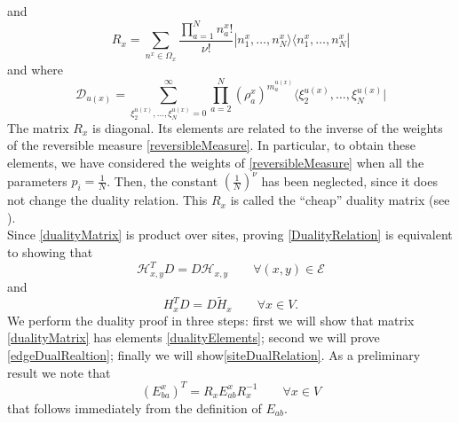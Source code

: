 \documentclass[11pt]{article}
\numberwithin{equation}{section}
\numberwithin{equation}{subsection}
\newcommand{\dd}{\mathcal{D}_{u(x)}}
\begin{document}
and
\begin{equation}\label{Revmatrix}
    R_{x}=\sum_{n^{x}\in\Omega_{x}}\frac{\prod_{a=1}^{N}n_{a}^{x}!}{\nu!}|n_{1}^{x},\ldots,n_{N}^{x}\rangle\langle n_{1}^{x},\ldots,n_{N}^{x}|
\end{equation}
and where 
\begin{equation}\label{dualityMatrix2}
\dd=\sum_{\xi_{2}^{u(x)},\ldots,\xi_{N}^{u(x)}=0}^{\infty}\prod_{a=2}^{N}\left(\rho_{a}^{x}\right)^{m_{a}^{u(x)}}\langle \xi_{2}^{u(x)},\ldots,\xi_{N}^{u(x)}|
\end{equation}
The matrix $R_{x}$ is diagonal. Its elements are related to the inverse of the weights of the reversible measure \eqref{reversibleMeasure}. In particular, to obtain these elements, we have considered the weights of \eqref{reversibleMeasure} when all the parameters $p_{i}=\frac{1}{N}$. Then, the constant $\left(\frac{1}{N}\right)^{\nu}$ has been neglected, since it does not change the duality relation. This $R_{x}$ is called the ``cheap'' duality matrix (see \cite{giardina2009duality}). \\
Since \eqref{dualityMatrix} is product over sites, proving \eqref{DualityRelation} is equivalent to showing that 
\begin{equation}\label{edgeDualRealtion}
    \mathcal{H}_{x,y}^{T}D=D\mathcal{H}_{x,y}\qquad \forall (x,y)\in \mathcal{E}
\end{equation}
and 
\begin{equation}\label{siteDualRelation}
    H_{x}^{T}D=D\widetilde{H}_{x}\qquad \forall x\in V.
\end{equation}
We perform the duality proof in three steps: first we will show that matrix \eqref{dualityMatrix} has elements \eqref{dualityElements}; second we will prove \eqref{edgeDualRealtion}; finally we will show\eqref{siteDualRelation}. 
As a preliminary result we note that 
\begin{equation}\label{transpositionPropertyR}
(E_{ba}^{x})^{T}=R_{x}E_{ab}^{x}R_{x}^{-1}\qquad \forall x\in V
\end{equation}
that follows immediately from the definition of $E_{ab}$. 

\end{document}
